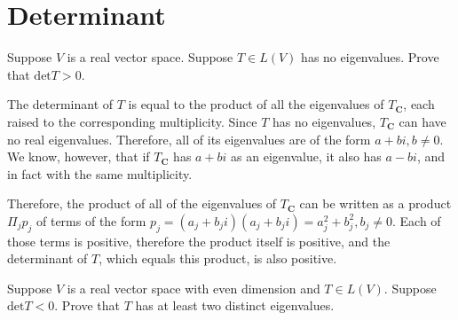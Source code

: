 \section{Determinant}

\begin{exercise}{1}
    Suppose $V$ is a real vector space. Suppose $T \in L(V)$ has no eigenvalues. Prove that $\text{det} T > 0$.
\end{exercise}

\begin{solution}

    The determinant of $T$ is equal to the product of all the eigenvalues of $T_\mathbf{C}$, each raised to the corresponding multiplicity. Since $T$ has no eigenvalues, $T_\mathbf{C}$ can have no real eigenvalues. Therefore, all of its eigenvalues are of the form $a+bi, b \neq 0$. We know, however, that if $T_\mathbf{C}$ has $a+bi$ as an eigenvalue, it also has $a-bi$, and in fact with the same multiplicity. 
    
    Therefore, the product of all of the eigenvalues of $T_\mathbf{C}$ can be written as a product $\Pi_jp_j$ of terms of the form $p_j = (a_j+b_ji)(a_j+b_ji) = a_j^2 + b_j^2, b_j \neq 0$. Each of those terms is positive, therefore the product itself is positive, and the determinant of $T$, which equals this product, is also positive.
\end{solution}

\begin{exercise}{2}
    Suppose $V$ is a real vector space with even dimension and $T \in L(V)$. Suppose $\text{det} T < 0$. Prove that $T$ has at least two distinct eigenvalues.
\end{exercise}

